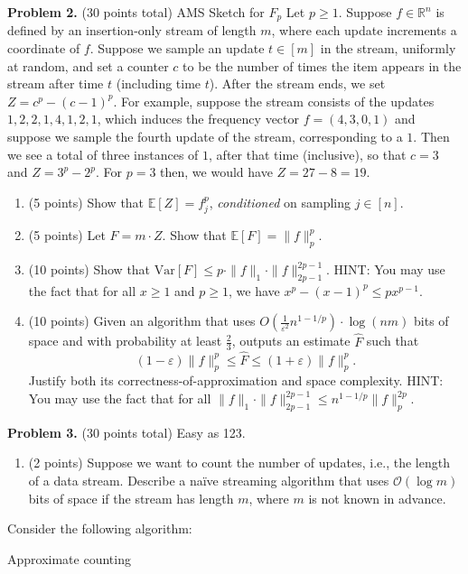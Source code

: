 \documentclass[11pt]{article}
\newcommand{\Ex}[1]{\ensuremath{\mathbb{E}\left[#1\right]}}
\newcommand{\Var}[1]{\ensuremath{\text{Var}\left[#1\right]}}
\newcommand{\eps}{\varepsilon}
\begin{document}
\vskip 0.2in\noindent
\textbf{Problem 2.} (30 points total)
AMS Sketch for $F_p$
\vskip 0.1in\noindent
Let $p\ge 1$. 
Suppose $f\in\mathbb{R}^n$ is defined by an insertion-only stream of length $m$, where each update increments a coordinate of $f$. 
Suppose we sample an update $t\in[m]$ in the stream, uniformly at random, and set a counter $c$ to be the number of times the item appears in the stream after time $t$ (including time $t$). 
After the stream ends, we set $Z=c^p-(c-1)^p$. 
\vskip 0.1in\noindent
For example, suppose the stream consists of the updates $1,2,2,1,4,1,2,1$, which induces the frequency vector $f=(4,3,0,1)$ and suppose we sample the fourth update of the stream, corresponding to a $1$. 
Then we see a total of three instances of $1$, after that time (inclusive), so that $c=3$ and $Z=3^p-2^p$. 
For $p=3$ then, we would have $Z=27-8=19$. 
\begin{enumerate}
\item (5 points)
Show that $\Ex{Z}=f_j^p$, \emph{conditioned} on sampling $j\in[n]$.
\item (5 points)
Let $F=m\cdot Z$. 
Show that $\Ex{F}=\|f\|_p^p$. 
\item (10 points)
Show that $\Var{F}\le p\cdot\|f\|_1\cdot\|f\|_{2p-1}^{2p-1}$. 
\vskip 0.1in\noindent
HINT: You may use the fact that for all $x\ge 1$ and $p\ge 1$, we have $x^p-(x-1)^p\le px^{p-1}$. 
\item (10 points)
Given an algorithm that uses $O\left(\frac{1}{\eps^2}n^{1-1/p}\right)\cdot\log(nm)$ bits of space and with probability at least $\frac{2}{3}$, outputs an estimate $\widehat{F}$ such that
\[(1-\eps)\|f\|_p^p\le\widehat{F}\le(1+\eps)\|f\|_p^p.\]
Justify both its correctness-of-approximation and space complexity. 
\vskip 0.1in\noindent
HINT: You may use the fact that for all $\|f\|_1\cdot\|f\|_{2p-1}^{2p-1}\le n^{1-1/p}\|f\|_p^{2p}$. 
\end{enumerate}
\vskip 0.2in\noindent
\textbf{Problem 3.} (30 points total)
Easy as 123.
\begin{enumerate}
\item (2 points)
Suppose we want to count the number of updates, i.e., the length of a data stream. 
Describe a na\"{i}ve streaming algorithm that uses $\mathcal{O}(\log m)$ bits of space if the stream has length $m$, where $m$ is not known in advance. 
\end{enumerate}
Consider the following algorithm:
\begin{algorithm}[!htb]
\caption{Approximate counting}
\begin{algorithmic}[1]
\EndIf
\EndFor
{}
\end{algorithmic}
\end{algorithm}
\end{document}
